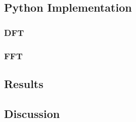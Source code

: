 \subsection{Python Implementation}
\subsubsection{DFT}
\subsubsection{FFT}
\subsection{Results}
\subsection{Discussion}
